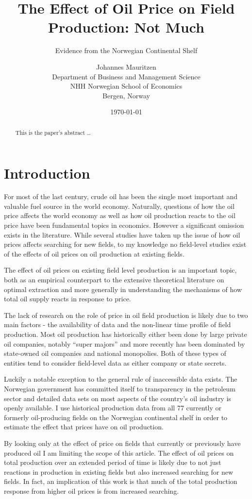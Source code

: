 \documentclass[12pt]{scrartcl} %
\title{The Effect of Oil Price on Field Production: Not Much}
\subtitle{Evidence from the Norwegian Continental Shelf}
\author{
  		Johannes Mauritzen \\
        Department of Business and Management Science\\
        NHH Norwegian School of Economics\\
        Bergen, Norway \\	           
		}
\date{\today}
\begin{document}
\maketitle

\begin{abstract}
This is the paper's abstract \ldots
\end{abstract}

\section{Introduction}

For most of the last century, crude oil has been the single most important and valuable fuel source in the world economy.  Naturally, questions of how the oil price affects the world economy as well as how oil production reacts to the oil price have been fundamental topics in economics. However a significant omission exists in the literature.  While several studies have taken up the issue of how oil prices affects searching for new fields, to my knowledge no field-level studies exist of the effects of oil prices on oil production at existing fields.  

The effect of oil prices on existing field level production is an important topic, both as an empirical counterpart to the extensive theoretical literature on optimal extraction and more generally in understanding the mechanisms of how total oil supply reacts in response to price.  

The lack of research on the role of price in oil field production is likely due to two main factors - the availability of data and the non-linear time profile of field production.  Most oil production has historically either been done by large private oil companies, notably “super majors” and more recently has been dominated by state-owned oil companies and national monopolies.  Both of these types of entities tend to consider field-level data as either company or state secrets.   

Luckily a notable exception to the general rule of inaccessible data exists.  The Norwegian government has committed itself to transparency in the petroleum sector and detailed data sets on most aspects of the country’s oil industry is openly available.  I use historical production data from all 77 currently or formerly oil-producing fields on the Norwegian continental shelf in order to estimate the effect that prices have on oil production.  

By looking only at the effect of price on fields that currently or previously have produced oil I am limiting the scope of this article.  The effect of oil prices on total production over an extended period of time is likely due to not just reactions in production in existing fields but also increased searching for new fields.  In fact, an implication of this work is that much of the total production response from higher oil prices is from increased searching.
\end{document}
